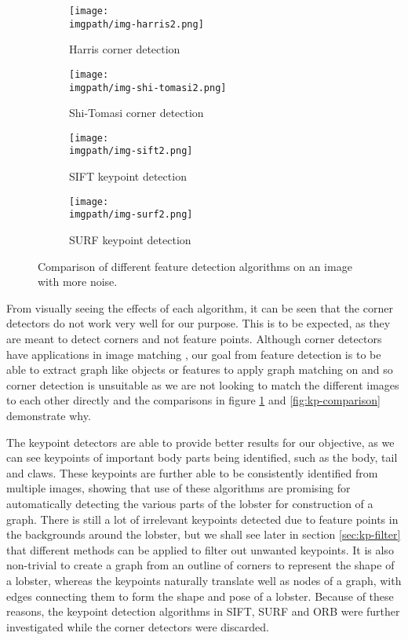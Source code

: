 \begin{figure}[H]
	\begin{subfigure}{0.45\textwidth}
	\texttt{[image: \\imgpath/img-harris2.png]}
	\caption{Harris corner detection}
	\end{subfigure}
	\hspace*{\fill}
	\begin{subfigure}{0.45\textwidth}
	\texttt{[image: \\imgpath/img-shi-tomasi2.png]}
	\caption{Shi-Tomasi corner detection}
	\end{subfigure}
	
	\vspace{0.5cm}
	
	\begin{subfigure}{0.45\textwidth}
	\texttt{[image: \\imgpath/img-sift2.png]}
	\caption{SIFT keypoint detection}
	\end{subfigure}
	\hspace*{\fill}
	\begin{subfigure}{0.45\textwidth}
	\texttt{[image: \\imgpath/img-surf2.png]}
	\caption{SURF keypoint detection}
	\end{subfigure}
	
\caption{Comparison of different feature detection algorithms on an image with more noise.}
\label{fig:kp-comparison-noise}
\end{figure}
\noindent
From visually seeing the effects of each algorithm, it can be seen that the corner detectors do not work very well for our purpose. This is to be expected, as they are meant to detect corners and not feature points. Although corner detectors have applications in image matching \cite{corner-detection}, our goal from feature detection is to be able to extract graph like objects or features to apply graph matching on and so corner detection is unsuitable as we are not looking to match the different images to each other directly and the comparisons in figure \ref{fig:kp-comparison-noise} and \ref{fig:kp-comparison} demonstrate why.

The keypoint detectors are able to provide better results for our objective, as we can see keypoints of important body parts being identified, such as the body, tail and claws. These keypoints are further able to be consistently identified from multiple images, showing that use of these algorithms are promising for automatically detecting the various parts of the lobster for construction of a graph. There is still a lot of irrelevant keypoints detected due to feature points in the backgrounds around the lobster, but we shall see later in section \ref{sec:kp-filter} that different methods can be applied to filter out unwanted keypoints. It is also non-trivial to create a graph from an outline of corners to represent the shape of a lobster, whereas the keypoints naturally translate well as nodes of a graph, with edges connecting them to form the shape and pose of a lobster. Because of these reasons, the keypoint detection algorithms in SIFT, SURF and ORB were further investigated while the corner detectors were discarded.

